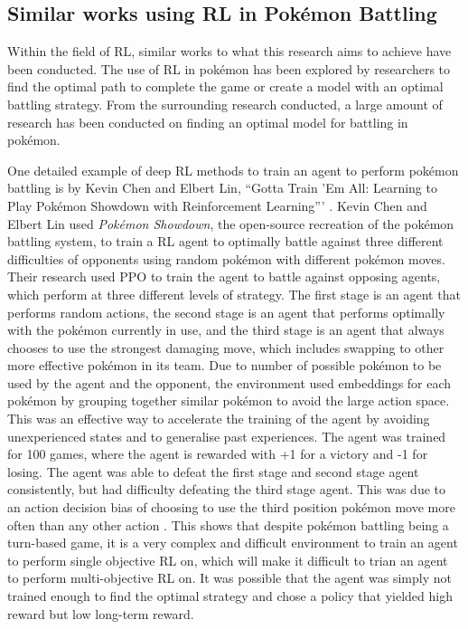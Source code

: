 \subsection{Similar works using RL in Pokémon Battling}

Within the field of RL, similar works to what this research aims to achieve have been conducted. The use of RL in pokémon has been explored by researchers to find the optimal path to complete the game or create a model with an optimal battling strategy. From the surrounding research conducted, a large amount of research has been conducted on finding an optimal model for battling in pokémon. 

One detailed example of deep RL methods to train an agent to perform pokémon battling is by Kevin Chen and Elbert Lin, ``Gotta Train 'Em All: Learning to Play Pokémon Showdown with Reinforcement Learning''' \cite{chen2018gotta}. Kevin Chen and Elbert Lin used \textit{Pokémon Showdown}, the open-source recreation of the pokémon battling system, to train a RL agent to optimally battle against three different difficulties of opponents using random pokémon with different pokémon moves. Their research used PPO to train the agent to battle against opposing agents, which perform at three different levels of strategy. The first stage is an agent that performs random actions, the second stage is an agent that performs optimally with the pokémon currently in use, and the third stage is an agent that always chooses to use the strongest damaging move, which includes swapping to other more effective pokémon in its team. Due to number of possible pokémon to be used by the agent and the opponent, the environment used embeddings for each pokémon by grouping together similar pokémon to avoid the large action space. This was an effective way to accelerate the training of the agent by avoiding unexperienced states and to generalise past experiences. The agent was trained for 100 games, where the agent is rewarded with +1 for a victory and -1 for losing. The agent was able to defeat the first stage and second stage agent consistently, but had difficulty defeating the third stage agent. This was due to an action decision bias of choosing to use the third position pokémon move more often than any other action \cite{chen2018gotta}. This shows that despite pokémon battling being a turn-based game, it is a very complex and difficult environment to train an agent to perform single objective RL on, which will make it difficult to trian an agent to perform multi-objective RL on. It was possible that the agent was simply not trained enough to find the optimal strategy and chose a policy that yielded high reward but low long-term reward. 

